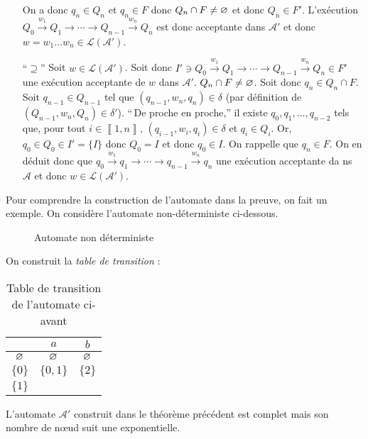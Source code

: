 \begin{prv}
\begin{itemize}
			On a donc $q_n \in Q_n$\/ et $q_n \in F$\/ donc $Q_n \cap F \neq \varnothing$\/ et donc $Q_n \in F'$.
			L'exécution $Q_0 \xrightarrow{w_1} Q_1 \to \cdots \to Q_{n-1} \xrightarrow{w_n} Q_n$ est donc acceptante dans $\mathcal{A}'$\/ et donc $w = w_1\ldots w_n \in \mathcal{L}(\mathcal{A}')$.
		\item[``$\supseteq$''] Soit $w \in \mathcal{L}(\mathcal{A}')$. Soit donc $I'\ni Q_0 \xrightarrow{w_1} Q_1\to \cdots\to Q_{n-1}\xrightarrow{w_n} Q_n \in F'$\/ une exécution acceptante de $w$\/ dans $\mathcal{A}'$.
		$Q_n \cap  F \neq \varnothing$. Soit donc $q_n \in Q_n \cap F$. Soit $q_{n-1} \in Q_{n-1}$\/ tel que $(q_{n-1}, w_n, q_n) \in \delta$ (par définition de $(Q_{n-1}, w_n, Q_n) \in \delta'$).
			``\,De proche en proche,'' il existe $q_0,q_1,\ldots,q_{n-2}$\/ tels que, pour tout $i \in \left\llbracket 1,n \right\rrbracket$, $(q_{i-1}, w_i, q_i) \in \delta$ et $q_i \in Q_i$.
			Or, $q_0 \in Q_0 \in I' = \{I\}$\/ donc $Q_0 = I$ et donc $q_0 \in I$.
			On rappelle que $q_n \in F$. On en déduit donc que $q_0 \xrightarrow{w_1} q_1 \to \cdots \to q_{n-1} \xrightarrow{w_n} q_n$ une exécution acceptante da ns $\mathcal{A}$\/ et donc $w \in \mathcal{L}(\mathcal{A}')$.
	\end{itemize}
\end{prv}

Pour comprendre la construction de l'automate dans la preuve, on fait un exemple. On considère l'automate non-déterministe ci-dessous.

\begin{figure}[H]
	\centering
	\caption{Automate non déterministe}
\end{figure}

On construit la {\it table de transition}\/ :

\begin{table}[H]
	\centering
	\begin{tabular}{c|c|c}
		&$a$&$b$\\\hline
		$\varnothing$&$\varnothing$&$\varnothing$\\ \hline
		$\{0\}$&$\{0,1\}$&$\{2\}$\\ \hline
		$\{1\}$&
	\end{tabular}
	\caption{Table de transition de l'automate ci-avant}
\end{table}


\begin{rmk}
	L'automate $\mathcal{A}'$\/ construit dans le théorème précédent est complet mais son nombre de nœud suit une exponentielle.
\end{rmk}


